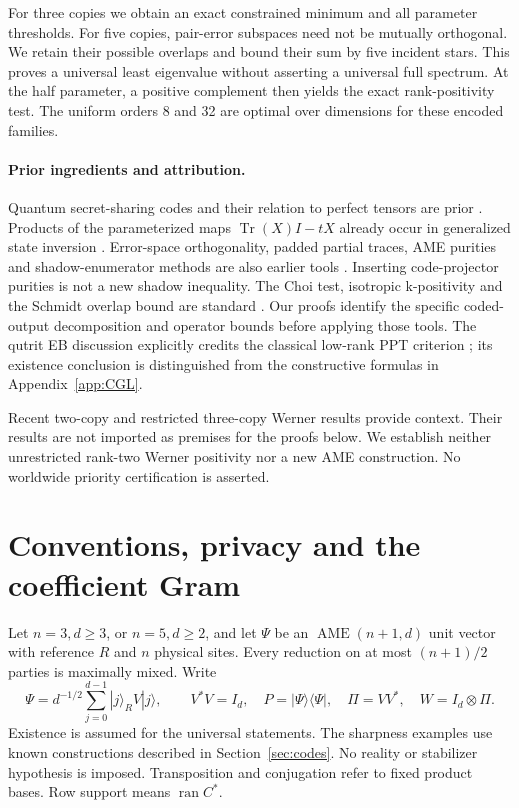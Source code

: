 \documentclass[11pt,a4paper]{article}
\newcommand{\Tr}{\operatorname{Tr}}
\newcommand{\ran}{\operatorname{ran}}
\begin{document}
For three copies we obtain an exact constrained minimum and all parameter thresholds. For five copies, pair-error subspaces need not be mutually orthogonal. We retain their possible overlaps and bound their sum by five incident stars. This proves a universal least eigenvalue without asserting a universal full spectrum. At the half parameter, a positive complement then yields the exact rank-positivity test. The uniform orders 8 and 32 are optimal over dimensions for these encoded families.

\paragraph{Prior ingredients and attribution.}
Quantum secret-sharing codes and their relation to perfect tensors are prior \cite{CGL,Helwig,Graph}. Products of the parameterized maps \(\Tr(X)I-tX\) already occur in generalized state inversion \cite{Eltschka}. Error-space orthogonality, padded partial traces, AME purities and shadow-enumerator methods are also earlier tools \cite{Huber}. Inserting code-projector purities is not a new shadow inequality. The Choi test, isotropic k-positivity and the Schmidt overlap bound are standard \cite{Choi,TH}. Our proofs identify the specific coded-output decomposition and operator bounds before applying those tools. The qutrit EB discussion explicitly credits the classical low-rank PPT criterion \cite{HLVC}; its existence conclusion is distinguished from the constructive formulas in Appendix~\ref{app:CGL}.

Recent two-copy and restricted three-copy Werner results \cite{Bharti,Fraser,WuZou} provide context. Their results are not imported as premises for the proofs below. We establish neither unrestricted rank-two Werner positivity nor a new AME construction. No worldwide priority certification is asserted.

\section{Conventions, privacy and the coefficient Gram}
Let \(n=3,d\ge3\), or \(n=5,d\ge2\), and let \(\Psi\) be an \(\operatorname{AME}(n+1,d)\) unit vector with reference \(R\) and \(n\) physical sites. Every reduction on at most \((n+1)/2\) parties is maximally mixed. Write
\begin{equation}\label{eq:encoding}
 \Psi=d^{-1/2}\sum_{j=0}^{d-1}|j\rangle_R V|j\rangle,
 \qquad V^*V=I_d,
 \quad P=|\Psi\rangle\langle\Psi|,
 \quad \Pi=VV^*,\quad W=I_d\otimes\Pi.
\end{equation}
Existence is assumed for the universal statements. The sharpness examples use known constructions described in Section~\ref{sec:codes}. No reality or stabilizer hypothesis is imposed. Transposition and conjugation refer to fixed product bases. Row support means \(\ran C^*\).
\end{document}
